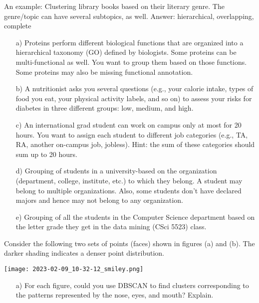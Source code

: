 \documentclass[11pt]{article}
\begin{document}
\begin{itemize}
An example: Clustering library books based on their literary genre. The genre/topic can have several subtopics, as well.
Answer: hierarchical, overlapping, complete
\begin{itemize}
  \item[a)]	Proteins perform different biological functions that are organized into a hierarchical taxonomy (GO) defined by biologists. Some proteins can be multi-functional as well. You want to group them based on those functions. Some proteins may also be missing functional annotation.
\item[b)]	A nutritionist asks you several questions (e.g., your calorie intake, types of food you eat, your physical activity labels, and so on) to assess your risks for diabetes in three different groups: low, medium, and high.
\item[c)]
An international grad student can work on campus only at most for 20 hours. You want to assign each student to different job categories (e.g., TA, RA, another on-campus job, jobless). Hint: the sum of these categories should sum up to 20 hours.
\item[d)]	Grouping of students in a university-based on the organization (department, college, institute, etc.)  to which they belong. A student may belong to multiple organizations. Also, some students don’t have declared majors and hence may not belong to any organization.
\item[e)]	Grouping of all the students in the Computer Science department based on the letter grade they get in the data mining (CSci 5523) class.
\end{itemize}
Consider the following two sets of points (faces) shown in figures (a) and (b). The darker shading indicates a denser point distribution.
\begin{center}
\texttt{[image: 2023-02-09\_10-32-12\_smiley.png]}
\end{center}
\begin{itemize}
\item[a)]	For each figure, could you use DBSCAN to find clusters corresponding to the patterns represented by the nose, eyes, and mouth? Explain.

\end{itemize}
\end{itemize}
\end{document}
